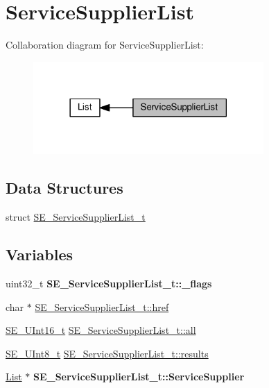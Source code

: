 \hypertarget{group__ServiceSupplierList}{}\section{Service\+Supplier\+List}
\label{group__ServiceSupplierList}
Collaboration diagram for Service\+Supplier\+List\+:\nopagebreak
\begin{figure}[H]
\begin{center}
\leavevmode
\includegraphics[width=249pt]{group__ServiceSupplierList}
\end{center}
\end{figure}
\subsection*{Data Structures}
\begin{DoxyCompactItemize}
\item 
struct \hyperlink{structSE__ServiceSupplierList__t}{S\+E\+\_\+\+Service\+Supplier\+List\+\_\+t}
\end{DoxyCompactItemize}
\subsection*{Variables}
\begin{DoxyCompactItemize}
\item 
\mbox{\label{group__ServiceSupplierList_gacd35257759aa9bd72dfced380a0d545e}} 
uint32\+\_\+t {\bfseries S\+E\+\_\+\+Service\+Supplier\+List\+\_\+t\+::\+\_\+flags}
\item 
char $\ast$ \hyperlink{group__ServiceSupplierList_gacfc612acee8ca5e00775dea00a91b6a6}{S\+E\+\_\+\+Service\+Supplier\+List\+\_\+t\+::href}
\item 
\hyperlink{group__UInt16_gac68d541f189538bfd30cfaa712d20d29}{S\+E\+\_\+\+U\+Int16\+\_\+t} \hyperlink{group__ServiceSupplierList_ga0c0d5b0fd6e9dd514527dc1e7f955d42}{S\+E\+\_\+\+Service\+Supplier\+List\+\_\+t\+::all}
\item 
\hyperlink{group__UInt8_gaf7c365a1acfe204e3a67c16ed44572f5}{S\+E\+\_\+\+U\+Int8\+\_\+t} \hyperlink{group__ServiceSupplierList_ga4fba3923e5af63d5f73c91930a2c9534}{S\+E\+\_\+\+Service\+Supplier\+List\+\_\+t\+::results}
\item 
\mbox{\label{group__ServiceSupplierList_ga81eda3f684bc62a16e6a28a0ba2a4f89}} 
\hyperlink{structList}{List} $\ast$ {\bfseries S\+E\+\_\+\+Service\+Supplier\+List\+\_\+t\+::\+Service\+Supplier}
\end{DoxyCompactItemize}


